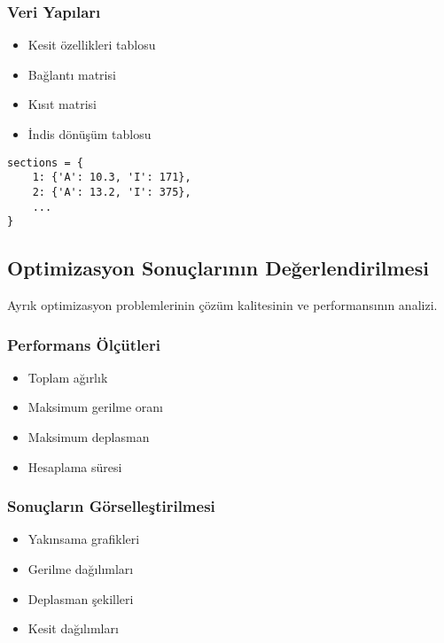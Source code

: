 
\subsubsection{Veri Yapıları}
\begin{itemize}
    \item Kesit özellikleri tablosu
    \item Bağlantı matrisi
    \item Kısıt matrisi
    \item İndis dönüşüm tablosu
\end{itemize}

\begin{tcolorbox}[title=Veri Yapısı Örneği]
\begin{verbatim}
sections = {
    1: {'A': 10.3, 'I': 171},
    2: {'A': 13.2, 'I': 375},
    ...
}
\end{verbatim}
\end{tcolorbox}

\subsection{Optimizasyon Sonuçlarının Değerlendirilmesi}
Ayrık optimizasyon problemlerinin çözüm kalitesinin ve performansının analizi.

\subsubsection{Performans Ölçütleri}
\begin{itemize}
    \item Toplam ağırlık
    \item Maksimum gerilme oranı
    \item Maksimum deplasman
    \item Hesaplama süresi
\end{itemize}

\subsubsection{Sonuçların Görselleştirilmesi}
\begin{itemize}
    \item Yakınsama grafikleri
    \item Gerilme dağılımları
    \item Deplasman şekilleri
    \item Kesit dağılımları
\end{itemize}

